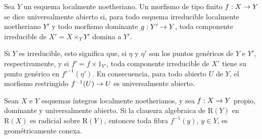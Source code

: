 \documentclass[oneside]{amsart}
\makeatletter
\newcommand{\ega@arrow}[2]{\mathchoice{#1}{#2}{#2}{#2}}
\renewcommand{\to}{\ega@arrow{\longrightarrow}{\rightarrow}}
\let\EGAOriginalLabel\label
\renewcommand{\label}[1]{\phantomsection\EGAOriginalLabel{#1}}
\makeatother
\begin{document}
\begin{definition}[4.3.9]
\label{III.4.3.9}
Sea $Y$ un esquema localmente noetheriano. Un morfismo de tipo finito
$f:X\to Y$ se dice universalmente abierto si, para todo esquema
irreducible localmente noetheriano $Y'$ y todo morfismo dominante
$g:Y'\to Y$, toda componente irreducible de
$X'=X\times_Y Y'$ domina a $Y'$.
\end{definition}

Si $Y$ es irreducible, esto significa que, si $\eta$ y $\eta'$ son
los puntos genéricos de $Y$ e $Y'$, respectivamente, y si
$f'=f\times 1_{Y'}$, toda componente irreducible de $X'$ tiene su
punto genérico en $f'^{-1}(\eta')$. En consecuencia, para todo
abierto $U$ de $Y$, el morfismo restringido $f^{-1}(U)\to U$ es
universalmente abierto.

\begin{corollary}[4.3.10]
\label{III.4.3.10}
Sean $X$ e $Y$ esquemas íntegros localmente noetherianos, y sea
$f:X\to Y$ propio, dominante y universalmente abierto. Si la clausura
algebraica de $\mathrm{R}(Y)$ en $\mathrm{R}(X)$ es radicial sobre
$\mathrm{R}(Y)$, entonces toda fibra $f^{-1}(y)$, $y\in Y$, es
geométricamente conexa.
\end{corollary}
\end{document}
